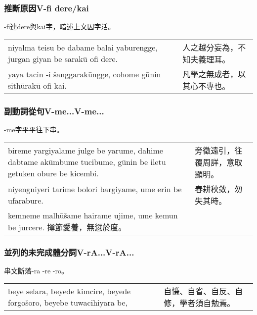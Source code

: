 \documentclass{article}
\begin{document}
\subsubsection{推斷原因V-fi dere/kai}
\noindent -fi連dere與kai字，暗述上文因字活。
\begin{center}
    \begin{tabularx}{\textwidth}{XX}
        niyalma teisu be dabame balai yaburengge, jurgan giyan be sarak\={u} ofi dere. & 人之越分妄為，不知夫義理耳。\\
        yaya tacin -i \v{s}anggarak\={u}ngge, cohome g\={u}nin sith\={u}rak\={u} ofi kai. & 凡學之無成者，以其心不專也。
    \end{tabularx}
\end{center}

\subsubsection{副動詞從句V-me...V-me...}
\noindent -me字平平往下串。
\begin{center}
    \begin{tabularx}{\textwidth}{XX}
        bireme yargiyalame julge be yarume, dahime dabtame ak\={u}mbume tucibume, g\={u}nin be iletu getuken obure be kicembi. & 旁徵遠引，往覆周詳，意取顯明。\\
        niyengniyeri tarime bolori bargiyame, ume erin be ufarabure. & 春耕秋敛，勿失其時。\\
        kemneme malh\={u}\v{s}ame hairame ujime, ume kemun be jurcere. 撙節愛養，無愆於度。
    \end{tabularx}
\end{center}

\subsubsection{並列的未完成體分詞V-rA...V-rA...}
\noindent 串文斷落-ra -re -ro。
\begin{center}
    \begin{tabularx}{\textwidth}{XX}
        beye selara, beyede kimcire, beyede forgo\v{s}oro, beyebe tuwacihiyara be,  & 自慊、自省、自反、自修，學者須自勉焉。\\
    \end{tabularx}
\end{center}
\end{document}
